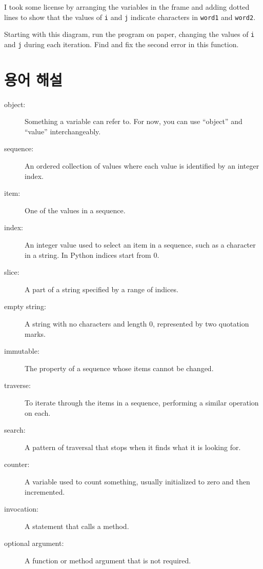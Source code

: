 \documentclass[10pt]{book}
\begin{document}
I took some license by arranging the variables in the frame
and adding dotted lines to show that the values of {\tt i} and
{\tt j} indicate characters in {\tt word1} and {\tt word2}.

Starting with this diagram, run the program on paper, changing the
values of {\tt i} and {\tt j} during each iteration.  Find and fix the
second error in this function.
\label{isreverse}


\section{용어 해설}

\begin{description}

\item[object:] Something a variable can refer to.  For now,
you can use ``object'' and ``value'' interchangeably.

\item[sequence:] An ordered collection of
values where each value is identified by an integer index.

\item[item:] One of the values in a sequence.

\item[index:] An integer value used to select an item in
a sequence, such as a character in a string.  In Python
indices start from 0.

\item[slice:] A part of a string specified by a range of indices.

\item[empty string:] A string with no characters and length 0, represented
by two quotation marks.

\item[immutable:] The property of a sequence whose items cannot
be changed.

\item[traverse:] To iterate through the items in a sequence,
performing a similar operation on each.

\item[search:] A pattern of traversal that stops
when it finds what it is looking for.

\item[counter:] A variable used to count something, usually initialized
to zero and then incremented.

\item[invocation:] A statement that calls a method.

\item[optional argument:] A function or method argument that is not
required.

\end{description}
\end{document}
